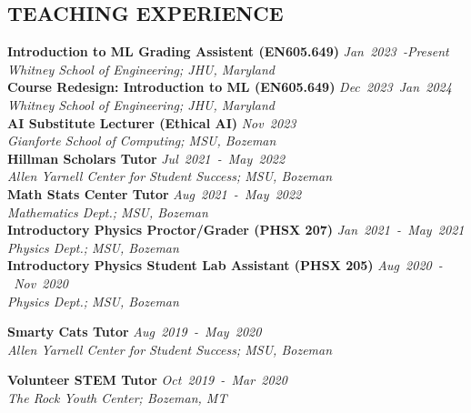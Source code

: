 \documentclass[margin]{res}
\begin{document}
\begin{resume}
\section{\uppercase{Teaching Experience}}
\textbf{Introduction to ML Grading Assistent (EN605.649)}\hfill
{\sl Jan~2023~-Present}\\
{\sl Whitney School of Engineering; JHU, Maryland}\vspace*{1ex}\\
\textbf{Course Redesign: Introduction to ML (EN605.649)}\hfill
{\sl Dec~2023~Jan~2024}\\
{\sl Whitney School of Engineering; JHU, Maryland}\vspace*{1ex}\\
\textbf{AI Substitute Lecturer (Ethical AI)}\hfill
{\sl Nov~2023}\\
{\sl Gianforte School of Computing; MSU, Bozeman}\vspace*{1ex}\\
\textbf{Hillman Scholars Tutor}\hfill
{\sl Jul~2021~-~May~2022}\\
{\sl Allen Yarnell Center for Student Success; MSU, Bozeman}\vspace*{1ex}\\
\textbf{Math Stats Center Tutor}\hfill
{\sl Aug~2021~-~May~2022}\\
{\sl Mathematics Dept.; MSU, Bozeman}\vspace*{1ex}\\
\textbf{Introductory Physics Proctor/Grader (PHSX 207)} \hfill 
{\sl Jan~2021~-~May~2021}\\
{\sl Physics Dept.; MSU, Bozeman}\vspace*{1ex}\\
\textbf{Introductory Physics Student Lab Assistant (PHSX 205)}\hfill
{\sl Aug~2020~-~Nov~2020}\\
{\sl Physics Dept.; MSU, Bozeman}\vspace*{1ex}\\
\noindent
\raggedright
\textbf{Smarty Cats Tutor}\hfill
{\sl Aug~2019~-~May~2020}\\
{\sl Allen Yarnell Center for Student Success; MSU, Bozeman}\vspace*{1ex}\\
\noindent
\raggedright
\textbf{Volunteer STEM Tutor}\hfill
{\sl Oct~2019~-~Mar~2020}\\
{\sl The Rock Youth Center; Bozeman, MT}




\end{resume}
\end{document}
